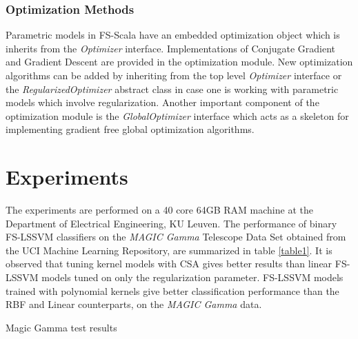 \documentclass[conference, cmex10]{IEEEtran}
\begin{document}
\subsubsection*{Optimization Methods}
Parametric models in FS-Scala have an embedded optimization object which is inherits from the \textit{Optimizer} interface. Implementations of Conjugate Gradient and Gradient Descent are provided in the optimization module. New optimization algorithms can be added by inheriting from the top level \textit{Optimizer} interface or the \textit{RegularizedOptimizer} abstract class in case one is working with parametric models which involve regularization. Another important component of the optimization module is the \textit{GlobalOptimizer} interface which acts as a skeleton for implementing gradient free global optimization algorithms.


\section{Experiments} \label{exp}

The experiments are performed on a 40 core 64GB RAM machine at the Department of Electrical Engineering, KU Leuven. The performance of binary FS-LSSVM classifiers on the \textit{MAGIC Gamma} Telescope Data Set obtained from the UCI Machine Learning Repository, are summarized in table \ref{table1}. It is observed that tuning kernel models with CSA gives better results than linear FS-LSSVM models tuned on only the regularization parameter. FS-LSSVM models trained with polynomial kernels give better classification performance than the RBF and Linear counterparts, on the \textit{MAGIC Gamma} data.

\begin{table*}[!htbp]
\begin{center}
\caption{Magic Gamma test results}
    \label{table1}
\end{center}
\end{table*}
\end{document}
